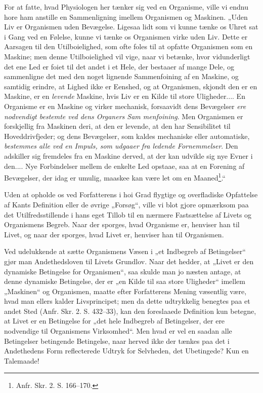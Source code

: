\documentclass[11pt]{book}
\newcommand{\opage}[1]{\marginnote{\footnotesize\textit{[#1]}}}
\begin{document}
For at fatte, hvad Physiologen her tænker sig ved en Organisme,
ville vi endnu hore ham anstille en Sammenligning imellem Organismen
og Maskinen. „Uden Liv er Organismen uden Bevægelse. Ligesaa lidt
som vi kunne tænke os Uhret sat i Gang ved en Følelse, kunne vi
tænke os Organismen virke uden Liv. Dette er Aarsagen til den
Utilboielighed, som ofte foles til at opfatte Organismen som en Maskine;
men denne Utilboielighed vil vige, naar vi betænke, hvor vidunderligt
det ene Led er foiet til det andet i et Hele, der bestaaer af mange
Dele, og sammenligne det med den noget lignende Sammenfoining af en
Maskine, og samtidig erindre, at Lighed ikke er Eenshed, og at
Organismen, skjondt den er en Maskine, er en \emph{levende} Maskine,
hvis Liv er en Kilde til store Uligheder.... En Organisme er en Maskine
og virker mechanisk, forsaavidt dens Bevægelser \emph{ere nodvendigt
bestemte ved dens Organers Sam\-%
menfoining}. Men Organismen er forskjellig fra Maskinen deri, at den er
levende, at den har Sensibilitet til Hoveddrivfjeder; og dens Bevægelser,
som kaldes mechaniske eller automatiske, \emph{bestemmes alle ved en
Impuls, som udgaaer fra ledende Fornemmelser}. Den adskiller sig
\opage{350} \setcounter{footnote}{0}%
fremdeles fra en Maskine derved, at der kan udvikle sig nye Evner i
den.... Nye Forbindelser mellem de enkelte Led opstaae, saa at en
Forening af Bevægelser, der idag er umulig, maaskee kan være let om
en Maaned\footnote{Anfr. Skr. 2. S. 166--170.}.“

Uden at opholde os ved Forfatterens i hoi Grad flygtige og
overfladiske Opfattelse af Kants Definition eller de øvrige „Forsøg“, ville
vi blot gjore opmærksom paa det Utilfredsstillende i hans eget Tillob til
en nærmere Fastsættelse af Livets og Organismens Begreb. Naar der
sporges, hvad Organisme er, henviser han til Livet, og naar der sporges,
hvad Livet er, henviser han til Organismen.

Ved udelukkende at sætte Organismens Væsen i „et Indbegreb af
Betingelser“ gjør man Andethedsloven til Livets Grundlov. Naar det
hedder, at „Livet er den dynamiske Betingelse for Organismen“, saa
skulde man jo næsten antage, at denne dynamiske Betingelse, der er „en
Kilde til saa store Uligheder“ imellem „Maskinen“ og Organismen,
maatte efter Forfatterens Mening væsentlig være, hvad man ellers kalder
Livsprincipet; men da dette udtrykkelig benegtes paa et andet Sted
(Anfr. Skr. 2. S. 432--33), kan den foreslaaede Definition kun betegne,
at Livet er en Betingelse for „det hele Indbegreb af Betingelser, der ere
nodvendige til Organismens Virksomhed“. Men hvad er vel en saadan
alle Betingelser betingende Betingelse, naar herved ikke der tænkes paa
det i Andethedens Form reflecterede Udtryk for Selvheden, det
Ubetingede? Kun en Talemaade!
\end{document}
